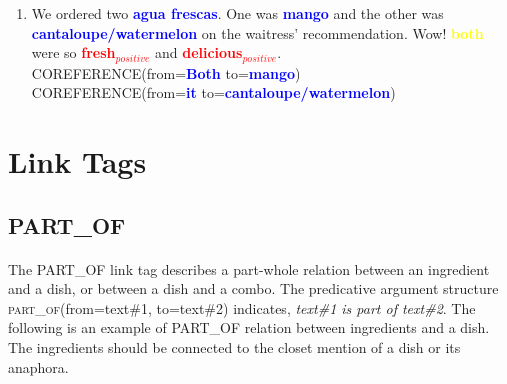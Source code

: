 \documentclass{article}
\begin{document}
\begin{enumerate}[resume]
	\item We ordered two \textbf{\textcolor{blue}{agua frescas}}. One was  \textbf{\textcolor{blue}{mango}} and the other was 
	\textbf{\textcolor{blue}{cantaloupe/watermelon}} on the waitress' recommendation. Wow! 
	\textbf{\textcolor{yellow}{both}} were so 
	\textbf{\textcolor{red}{fresh$_{positive}$}} and 
	\textbf{\textcolor{red}{delicious$_{positive}$}}.\\
		\textsc{COREFERENCE}(from=\textbf{\textcolor{blue}{Both}} to=\textbf{\textcolor{blue}{mango}}) \\
		\textsc{COREFERENCE}(from=\textbf{\textcolor{blue}{it}} to=\textbf{\textcolor{blue}{cantaloupe/watermelon}}) \\
	
\end{enumerate}

\newpage
\section{Link Tags}


\subsection{PART\_OF}
\paragraph{}
The PART\_OF link tag describes a part-whole relation between an ingredient and a dish, or between a dish and a combo. The predicative argument structure \textsc{part\_of}(from=text\#1, to=text\#2) indicates, \textit{text\#1 is part of text\#2}. The following is an example of PART\_OF relation between ingredients and a dish. The ingredients should be connected to the closet mention of a dish or its anaphora. 
\end{document}
